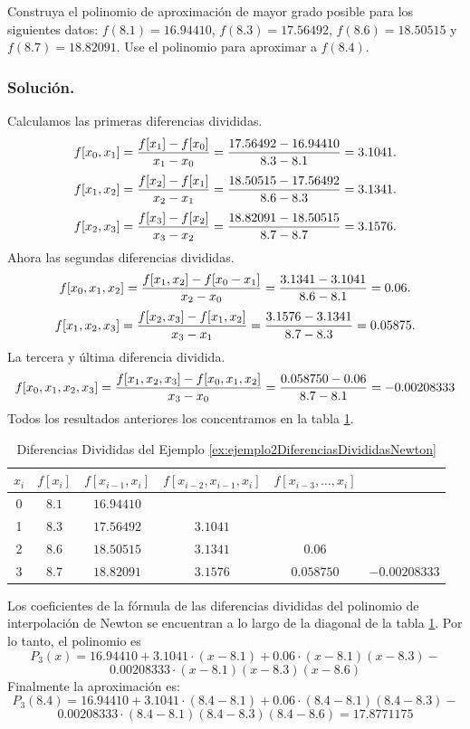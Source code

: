 \begin{exerciseT}
	Construya el polinomio de aproximación de mayor grado posible para los siguientes datos: $f(8.1)=16.94410$, $f(8.3)=17.56492$,
		$f(8.6)=18.50515$ y $f(8.7)=18.82091$. Use el polinomio para aproximar a $f(8.4)$.\\
	\subsubsection*{Solución.} 
		Calculamos las primeras diferencias divididas.
		$$f[x_0,x_1] = {f[x_1] - f[x_0]\over x_1 - x_0} = {17.56492-16.94410\over 8.3-8.1} = 3.1041.$$
		$$f[x_1,x_2] = {f[x_2] - f[x_1]\over x_2 - x_1} = {18.50515-17.56492\over 8.6-8.3} = 3.1341.$$
		$$f[x_2,x_3] = {f[x_3] - f[x_2]\over x_3 - x_2} = {18.82091-18.50515\over 8.7-8.7} = 3.1576.$$
		Ahora las segundas diferencias divididas.
		$$f[x_0,x_1,x_2] = {f[x_1,x_2] - f[x_0-x_1]\over x_2 - x_0} = {3.1341-3.1041\over 8.6-8.1} = 0.06.$$
		$$f[x_1,x_2,x_3] = {f[x_2,x_3] - f[x_1,x_2]\over x_3 - x_1} = {3.1576-3.1341\over 8.7-8.3} = 0.05875.$$
		La tercera y última diferencia dividida.
		$$f[x_0,x_1,x_2,x_3] = {f[x_1,x_2,x_3]-f[x_0,x_1,x_2]\over x_3-x_0} = {0.058750-0.06\over 8.7-8.1} = -0.00208333$$
	Todos los resultados anteriores los concentramos en la tabla \ref{table:ejemplo2DiferenciasDivididasNewton}.
	\begin{table}[H]
		\centering
      	\begin{tabular}{cccccc}
 			\toprule
 			$x_i$ & $f[x_i]$ & $f[x_{i-1}, x_i]$ & $f[x_{i-2},x_{i-1},x_i]$ & $f[x_{i-3},\dots,x_i]$\\ \midrule
			0 & $8.1$ & $16.94410$ & & & \\
			1 & $8.3$ & $17.56492$ & $3.1041$ &  & \\
			2 & $8.6$ & $18.50515$ & $3.1341$ & $0.06$ & \\
			3 & $8.7$ & $18.82091$ & $3.1576$ & $0.058750$ & $-0.00208333$ \\
			\bottomrule
      	\end{tabular}
      	\caption{Diferencias Divididas del Ejemplo \ref{ex:ejemplo2DiferenciasDivididasNewton}}
      	\label{table:ejemplo2DiferenciasDivididasNewton}
	\end{table}

	Los coeficientes de la fórmula de las diferencias divididas del polinomio de interpolación de Newton se encuentran a lo largo de la diagonal 
	de la tabla \ref{table:ejemplo2DiferenciasDivididasNewton}. Por lo tanto, el polinomio es
	$$P_3(x) = 16.94410 + 3.1041\cdot(x-8.1) + 0.06\cdot(x-8.1)(x-8.3) - $$
	$$0.00208333\cdot(x-8.1)(x-8.3)(x-8.6)$$	
	Finalmente la aproximación es:
	$$P_3(8.4) = 16.94410 + 3.1041\cdot(8.4-8.1) + 0.06\cdot(8.4-8.1)(8.4-8.3) - $$
	$$0.00208333\cdot(8.4-8.1)(8.4-8.3)(8.4-8.6) = 17.8771175$$
	
	\label{ex:ejemplo2DiferenciasDivididasNewton}
\end{exerciseT}


